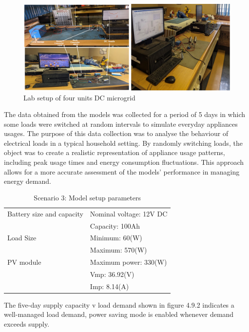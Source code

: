 \begin{figure}[H]
	\centering
	\includegraphics[totalheight=6cm]{Figures/Lab setup of four units DC microgrid.png}
	\caption{Lab setup of four units DC microgrid}
\end{figure} 
The data obtained from the models was collected for a period of 5 days in which some loads were switched at random intervals to simulate everyday appliances usages. The purpose of this data collection was to analyse the behaviour of electrical loads in a typical household setting. By randomly switching loads, the object was to create a realistic representation of appliance usage patterns, including peak usage times and energy consumption fluctuations. This approach allows for a more accurate assessment of the models' performance in managing energy demand.
\begin{table}[!ht]
	\begin{center}
		\caption{Scenario 3: Model setup parameters}
		\begin{tabular}{|p{6cm}|p{8cm}|} %
			\hline
			Battery size and capacity	& Nominal voltage: 12V DC \\
			& Capacity: 100Ah\\
			\hline
			Load Size 					& Minimum: 60(W)\\
			& Maximum: 570(W)\\
			\hline
			PV module		 			& Maximum power: 330(W)\\
			& Vmp: 36.92(V)\\
			& Imp: 8.14(A)\\
			\hline
		\end{tabular}
	\end{center}
\end{table}
The five-day supply capacity v load demand shown in figure 4.9.2 indicates a well-managed load demand, power saving mode is enabled whenever demand exceeds supply.

